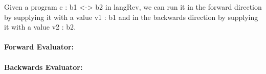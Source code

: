 \documentclass{llncs}
\begin{document}
\begin{definition}
\label{def:operational-langRevTF}
Given a program {{c : b1 <-> b2}} in {{langRev}}, we can run it in the
forward direction by supplying it with a value {{ v1 : b1 }} and in
the backwards direction by supplying it with a value {{v2 : b2}}. 

\paragraph*{Forward Evaluator:}

\paragraph*{Backwards Evaluator:}


\end{definition}
\end{document}
